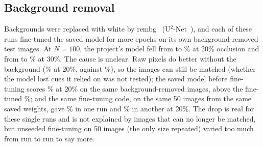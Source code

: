 \subsection{Background removal}\label{sec:bg}

Backgrounds were replaced with white by rembg~\cite{rembg} (U$^2$-Net~\cite{qin2020u2net}), and each of these runs fine-tuned the saved model for  more epochs on its own background-removed test images. At $N=100$, the project's model fell from  to \% at 20\% occlusion and from  to \% at 30\%. The cause is unclear. Raw pixels do better without the background (\% at 20\%, against \%), so the images can still be matched (whether the model lost cues it relied on was not tested); the saved model before fine-tuning scores \% at 20\% on the same background-removed images, above the fine-tuned \%; and the same fine-tuning code, on the same 50 images from the same saved weights, gave \% in one run and \% in another at 20\%. The drop is real for these single runs and is not explained by images that can no longer be matched, but unseeded fine-tuning on 50 images (the only size repeated) varied too much from run to run to say more.
